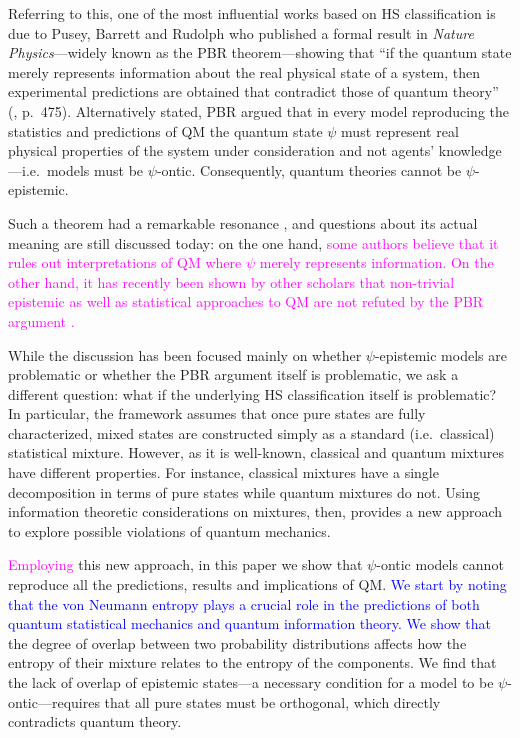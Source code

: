 \documentclass[10pt,twocolumn, nofootinbib]{revtex4-2}
\begin{document}
Referring to this, one of the most influential works based on HS classification is due to Pusey, Barrett and Rudolph who published a formal result in \emph{Nature Physics}---widely known as the PBR theorem---showing that ``if the quantum state merely represents information about the real physical state of a system, then experimental predictions are obtained that contradict those of quantum theory'' (\cite{PBR:2012}, p.\ 475). Alternatively stated, PBR argued that in every model reproducing the statistics and predictions of QM the quantum state $\psi$ must represent real physical properties of the system under consideration and not agents' knowledge---i.e.\ models must be $\psi$-ontic. Consequently, quantum theories cannot be $\psi$-epistemic. 

Such a theorem had a remarkable resonance \cite{Leifer:2014, Leifer:2014b, Lewis:2012, Renner:2012, Colbeck:2017, Hardy:2013, Maroney:2014, Patra:2013, Mansfield:2016, Schlosshauer:2012, Schlosshauer:2013, Schlosshauer:2014, Aaronson:2013}, and questions about its actual meaning are still discussed today: on the one hand, \textcolor{magenta}{some authors believe that it rules out interpretations of QM where $\psi$ merely represents information. On the other hand, it has recently been shown by other scholars that non-trivial epistemic as well as statistical approaches to QM are not refuted by the PBR argument \cite{Ben:2017, Rizzi:2018, Oldofredi:2020b, Oldofredi:2021, DeBrota:2019}.}

While the discussion has been focused mainly on whether $\psi$-epistemic models are problematic or whether the PBR argument itself is problematic, we ask a different question: what if the underlying HS classification itself is problematic? In particular, the framework assumes that once pure states are fully characterized, mixed states are constructed simply as a standard (i.e.\ classical) statistical mixture. However, as it is well-known, classical and quantum mixtures have different properties. For instance, classical mixtures have a single decomposition in terms of pure states while quantum mixtures do not. Using information theoretic considerations on mixtures, then, provides a new approach to explore possible violations of quantum mechanics.

\textcolor{magenta}{Employing} this new approach, in this paper we show that $\psi$-ontic models cannot reproduce all the predictions, results and implications of QM. \textcolor{blue}{We start by noting that the von Neumann entropy plays a crucial role in the predictions of both quantum statistical mechanics and quantum information theory. We show that} the degree of overlap between two probability distributions affects how the entropy of their mixture relates to the entropy of the components. We find that the lack of overlap of epistemic states---a necessary condition for a model to be $\psi$-ontic---requires that all pure states must be orthogonal, which directly contradicts quantum theory.
\end{document}

